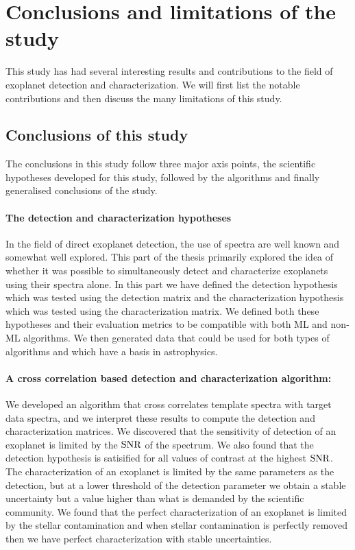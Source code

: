 \section{Conclusions and limitations of the study}
This study has had several interesting results and contributions to the field of exoplanet detection and characterization.
We will first list the notable contributions and then discuss the many limitations of this study.

\subsection{Conclusions of this study}
The conclusions in this study follow three major axis points, the scientific hypotheses developed for this study, followed by the algorithms and finally generalised conclusions of the study.
\paragraph{The detection and characterization hypotheses\\}
In the field of direct exoplanet detection, the use of spectra are well known and somewhat well explored.
This part of the thesis primarily explored the idea of whether it was possible to simultaneously detect and characterize exoplanets using their spectra alone.
In this part we have defined the detection hypothesis which was tested using the detection matrix and the characterization hypothesis which was tested using the characterization matrix.
We defined both these hypotheses and their evaluation metrics to be compatible with both ML and non-ML algorithms. 
We then generated data that could be used for both types of algorithms and which have a basis in astrophysics.

\paragraph{A cross correlation based detection and characterization algorithm:\\}
We developed an algorithm that cross correlates template spectra with target data spectra, and we interpret these results to compute the detection and characterization matrices.
We discovered that the sensitivity of detection of an exoplanet is limited by the $\rm{SNR}$ of the spectrum. 
We also found that the detection hypothesis is satisified for all values of contrast at the highest $\rm{SNR}$.
The characterization of an exoplanet is limited by the same parameters as the detection, but at a lower threshold of the detection parameter we obtain a stable uncertainty but a value higher than what is demanded by the scientific community.
We found that the perfect characterization of an exoplanet is limited by the stellar contamination and when stellar contamination is perfectly removed then we have perfect characterization with stable uncertainties.

